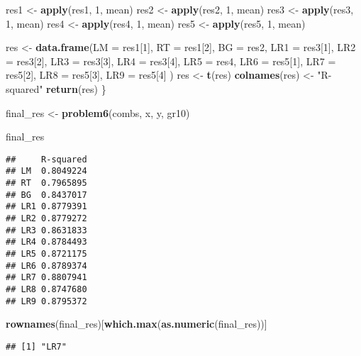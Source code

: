 \documentclass[
]{article}
\newenvironment{Shaded}{\begin{snugshade}}{\end{snugshade}}
\newcommand{\AttributeTok}[1]{\textcolor[rgb]{0.13,0.29,0.53}{#1}}
\newcommand{\DecValTok}[1]{\textcolor[rgb]{0.00,0.00,0.81}{#1}}
\newcommand{\FunctionTok}[1]{\textcolor[rgb]{0.13,0.29,0.53}{\textbf{#1}}}
\newcommand{\NormalTok}[1]{#1}
\newcommand{\OtherTok}[1]{\textcolor[rgb]{0.56,0.35,0.01}{#1}}
\newcommand{\StringTok}[1]{\textcolor[rgb]{0.31,0.60,0.02}{#1}}
\begin{document}
\begin{Shaded}
\begin{Highlighting}[]
\NormalTok{  res1 }\OtherTok{\textless{}{-}} \FunctionTok{apply}\NormalTok{(res1, }\DecValTok{1}\NormalTok{, mean)}
\NormalTok{  res2 }\OtherTok{\textless{}{-}} \FunctionTok{apply}\NormalTok{(res2, }\DecValTok{1}\NormalTok{, mean)}
\NormalTok{  res3 }\OtherTok{\textless{}{-}} \FunctionTok{apply}\NormalTok{(res3, }\DecValTok{1}\NormalTok{, mean)}
\NormalTok{  res4 }\OtherTok{\textless{}{-}} \FunctionTok{apply}\NormalTok{(res4, }\DecValTok{1}\NormalTok{, mean)}
\NormalTok{  res5 }\OtherTok{\textless{}{-}} \FunctionTok{apply}\NormalTok{(res5, }\DecValTok{1}\NormalTok{, mean)}
  
\NormalTok{  res }\OtherTok{\textless{}{-}} \FunctionTok{data.frame}\NormalTok{(}\AttributeTok{LM =}\NormalTok{ res1[}\DecValTok{1}\NormalTok{], }\AttributeTok{RT =}\NormalTok{ res1[}\DecValTok{2}\NormalTok{],}
                    \AttributeTok{BG =}\NormalTok{ res2, }\AttributeTok{LR1 =}\NormalTok{ res3[}\DecValTok{1}\NormalTok{],}
                    \AttributeTok{LR2 =}\NormalTok{ res3[}\DecValTok{2}\NormalTok{], }\AttributeTok{LR3 =}\NormalTok{ res3[}\DecValTok{3}\NormalTok{],}
                    \AttributeTok{LR4 =}\NormalTok{ res3[}\DecValTok{4}\NormalTok{], }\AttributeTok{LR5 =}\NormalTok{ res4,}
                    \AttributeTok{LR6 =}\NormalTok{ res5[}\DecValTok{1}\NormalTok{], }\AttributeTok{LR7 =}\NormalTok{ res5[}\DecValTok{2}\NormalTok{],}
                    \AttributeTok{LR8 =}\NormalTok{ res5[}\DecValTok{3}\NormalTok{], }\AttributeTok{LR9 =}\NormalTok{ res5[}\DecValTok{4}\NormalTok{]}
\NormalTok{                    )}
\NormalTok{  res }\OtherTok{\textless{}{-}} \FunctionTok{t}\NormalTok{(res)}
  \FunctionTok{colnames}\NormalTok{(res) }\OtherTok{\textless{}{-}} \StringTok{"R{-}squared"}
  \FunctionTok{return}\NormalTok{(res)}
\NormalTok{\}}

\NormalTok{final\_res }\OtherTok{\textless{}{-}} \FunctionTok{problem6}\NormalTok{(combs, x, y, gr10)}
\end{Highlighting}
\end{Shaded}

\begin{Shaded}
\begin{Highlighting}[]
\NormalTok{final\_res}
\end{Highlighting}
\end{Shaded}

\begin{verbatim}
##     R-squared
## LM  0.8049224
## RT  0.7965895
## BG  0.8437017
## LR1 0.8779391
## LR2 0.8779272
## LR3 0.8631833
## LR4 0.8784493
## LR5 0.8721175
## LR6 0.8789374
## LR7 0.8807941
## LR8 0.8747680
## LR9 0.8795372
\end{verbatim}

\begin{Shaded}
\begin{Highlighting}[]
\FunctionTok{rownames}\NormalTok{(final\_res)[}\FunctionTok{which.max}\NormalTok{(}\FunctionTok{as.numeric}\NormalTok{(final\_res))]}
\end{Highlighting}
\end{Shaded}

\begin{verbatim}
## [1] "LR7"
\end{verbatim}
\end{document}
